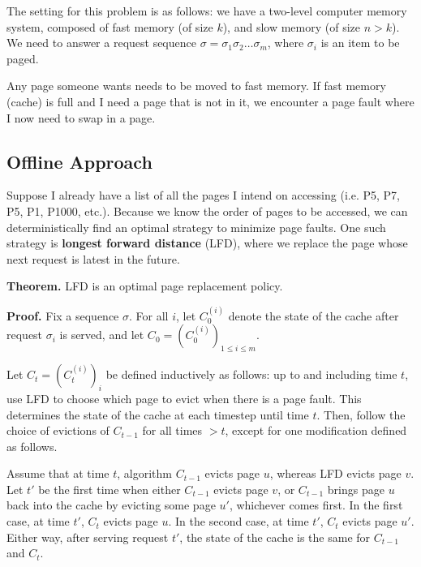 \documentclass[14pt]{extreport}
\begin{document}
    The setting for this problem is as follows: we have a two-level computer memory system, composed of fast memory (of size $k$), and slow memory (of size $n > k$). We need to answer a request sequence $\sigma = \sigma_{1}\sigma_{2}\dots\sigma_{m}$, where $\sigma_{i}$ is an item to be paged.

    \vspace{5mm}
    Any page someone wants needs to be moved to fast memory. If fast memory (cache) is full and I need a page that is not in it, we encounter a page fault where I now need to swap in a page.


\subsection*{Offline Approach}
    Suppose I already have a list of all the pages I intend on accessing (i.e. P5, P7, P5, P1, P1000, etc.). Because we know the order of pages to be accessed, we can deterministically find an optimal strategy to minimize page faults. One such strategy is \textbf{longest forward distance} (LFD), where we replace the page whose next request is latest in the future.

    \vspace{5mm}
    \textbf{Theorem.} LFD is an optimal page replacement policy.

    \vspace{5mm}
    \textbf{Proof.}
    Fix a sequence $\sigma$. For all $i$, let $C_{0}^{(i)}$ denote the state of the cache after request $\sigma_{i}$ is served, and let $C_{0} = (C_{0}^{(i)})_{1 \le i \le m}$.

    \vspace{5mm}
    Let \( C_t = (C^{(i)}_t)_i \) be defined inductively as follows: up to and including time \( t \), use LFD to choose which page to evict when there is a page fault. This determines the state of the cache at each timestep until time \( t \). Then, follow the choice of evictions of \( C_{t-1} \) for all times \( > t \), except for one modification defined as follows.

    \vspace{2mm}
    Assume that at time \( t \), algorithm \( C_{t-1} \) evicts page \( u \), whereas LFD evicts page \( v \). Let \( t' \) be the first time when either \( C_{t-1} \) evicts page \( v \), or \( C_{t-1} \) brings page \( u \) back into the cache by evicting some page \( u' \), whichever comes first. In the first case, at time \( t' \), \( C_t \) evicts page \( u \). In the second case, at time \( t' \), \( C_t \) evicts page \( u' \). Either way, after serving request \( t' \), the state of the cache is the same for \( C_{t-1} \) and \( C_t \).
\end{document}
